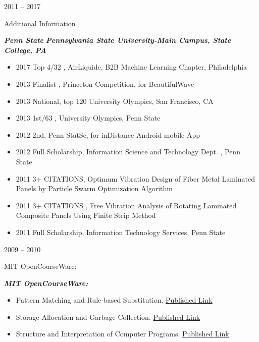 \documentclass[a4paper,10pt]{article}
\newlength{\cvcolumngapwidth}
\newlength{\cvleftcolumnwidth}
\newlength{\cvrightcolumnwidth}
\newcommand{\cvtitlestyle}[1]{{\large\cvtitlefont\textcolor{cvtitlecolor}{#1}}}
\newcommand{\cvdurationstyle}[1]{{\small\cvdurationfont\textcolor{cvdurationcolor}{#1}}}
\newlength{\cvafteritemskipamount}
\newlength{\cvaftertitleskipamount}
\newlength{\cvparskip}
\newcommand{\cvitem}[2]{
    \begin{minipage}[t]{\cvleftcolumnwidth}
        \raggedleft #1
    \end{minipage}%
    \hspace{\cvcolumngapwidth}%
    \begin{minipage}[t]{\cvrightcolumnwidth}
        \setlength{\parskip}{\cvparskip} #2
    \end{minipage}

    \vspace{\cvafteritemskipamount}
}
\newcommand{\cvtitle}[1]{
    \cvtitlestyle{#1}

    \vspace{\cvaftertitleskipamount}
    \vspace{-\cvparskip}
}
\begin{document}
\cvitem{
    \cvdurationstyle{2011 -- 2017}
    }
{
    \cvtitle{Additional Information}
    \textcolor{cvwhatcolor}{\emph{\textbf{{Penn State}}}}
    \textcolor{cvwherecolor}{\textbf{\textbar}}
    \textcolor{cvwherecolor}{\emph{\textbf{Pennsylvania State University-Main Campus, State College, PA}}}   

\begin{itemize}[leftmargin=*]
        \item 2017 Top 4/32 , AirLiquide, B2B Machine Learning Chapter, Philadelphia 
        \item 2013 Finalist , Princeton Competition, for BeautifulWave

        \item  2013 National, top 120 University Olympics, San Francisco, CA

        \item 2013 1st/63 , University Olympics, Penn State
        \item 2012 2nd, Penn StatSe, for inDistance Android mobile App
        \item 2012 Full Scholarship, Information Science and Technology Dept. , Penn State
        \item 2011 3+ CITATIONS, Optimum Vibration Design of Fiber Metal Laminated Panels by Particle Swarm Optimization Algorithm
        \item 2011 3+ CITATIONS , Free Vibration Analysis of Rotating Laminated Composite Panels Using Finite Strip Method
        \item 2011 Full Scholarship, Information Technology Services, Penn State

    \end{itemize}

}
\cvitem{
    \cvdurationstyle{ 2009 --  2010}
    }
{
    \cvtitle{MIT OpenCourseWare:}
        \textcolor{cvwhatcolor}{\emph{\textbf{{MIT OpenCourseWare:}}}}
 

    \begin{itemize}[leftmargin=*]
    
        \item Pattern Matching and Rule-based Substitution.  \href{https://www.youtube.com/watch?v=amf5lTZ0UTc}{Published Link}
        \item Storage Allocation and Garbage Collection. \href{https://www.youtube.com/watch?v=2s2_FAf-yQs}{Published Link}
        \item Structure and Interpretation of Computer Programs.  \href{https://www.youtube.com/watch?v=2Op3QLzMgSY}{Published Link}
        
    \end{itemize}
}
\end{document}
